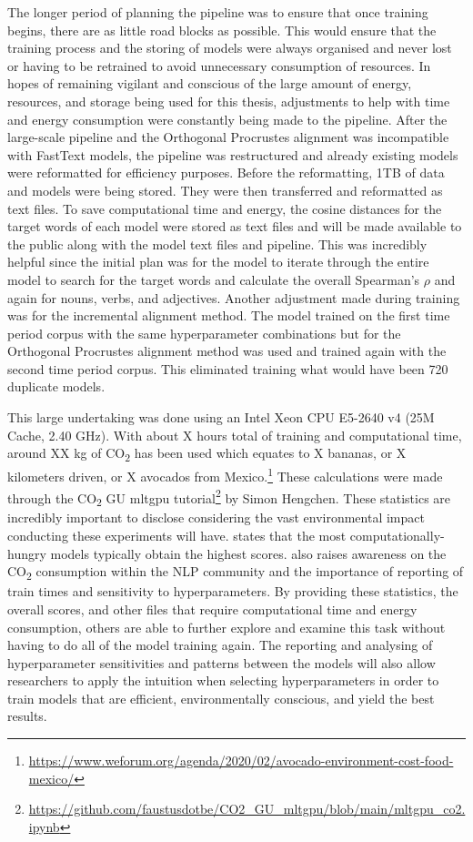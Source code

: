 The longer period of planning the pipeline was to ensure that once training begins, there are as little road blocks as possible. This would ensure that the training process and the storing of models were always organised and never lost or having to be retrained to avoid unnecessary consumption of resources. In hopes of remaining vigilant and conscious of the large amount of energy, resources, and storage being used for this thesis, adjustments to help with time and energy consumption were constantly being made to the pipeline. After the large-scale pipeline and the Orthogonal Procrustes alignment was incompatible with FastText models, the pipeline was restructured and already existing models were reformatted for efficiency purposes. Before the reformatting, 1TB of data and models were being stored. They were then transferred and reformatted as text files. To save computational time and energy, the cosine distances for the target words of each model were stored as text files and will be made available to the public along with the model text files and pipeline. This was incredibly helpful since the initial plan was for the model to iterate through the entire model to search for the target words and calculate the overall Spearman’s $\rho$ and again for nouns, verbs, and adjectives. Another adjustment made during training was for the incremental alignment method. The model trained on the first time period corpus with the same hyperparameter combinations but for the Orthogonal Procrustes alignment method was used and trained again with the second time period corpus. This eliminated training what would have been 720 duplicate models.  

This large undertaking was done using an Intel Xeon CPU E5-2640 v4 (25M Cache, 2.40 GHz). With about X hours total of training and computational time, around XX kg of CO\textsubscript{2} has been used which equates to X bananas, or X kilometers driven, or X avocados from Mexico.\footnote{\url{https://www.weforum.org/agenda/2020/02/avocado-environment-cost-food-mexico/}} These calculations were made through the CO\textsubscript{2} GU mltgpu tutorial\footnote{\url{https://github.com/faustusdotbe/CO2_GU_mltgpu/blob/main/mltgpu_co2.ipynb}} by Simon Hengchen. These statistics are incredibly important to disclose considering the vast environmental impact conducting these experiments will have. 
\citet{strubell-etal-2019-energy} states that the most computationally-hungry models typically obtain the highest scores. \citet{strubell-etal-2019-energy} also raises awareness on the CO\textsubscript{2} consumption within the NLP community and the importance of reporting of train times and sensitivity to hyperparameters. By providing these statistics, the overall scores, and other files that require computational time and energy consumption, others are able to  further explore and examine this task without having to do all of the model training again. The reporting and analysing of hyperparameter sensitivities and patterns between the models will also allow researchers to apply the intuition when selecting hyperparameters in order to train models that are efficient, environmentally conscious, and yield the best results.

